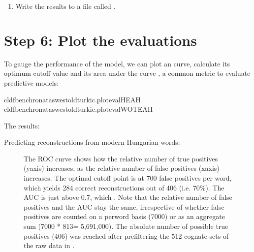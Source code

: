 \documentclass[letterpaper,10pt,english]{sphinxmanual}
\begin{document}
{{{{\begin{fulllineitems}
\begin{enumerate}
\item {} 
\sphinxAtStartPar
Write the results to a file called .

\end{enumerate}

\end{fulllineitems}



\section{Step 6: Plot the evaluations}
\label{\detokenize{mkloanpy:step-6-plot-the-evaluations}}
\sphinxAtStartPar
To gauge the performance of the model, we can plot an  curve,
calculate its optimum cut\sphinxhyphen{}off value and its area under the curve ,
a common metric to evaluate predictive models:

\begin{sphinxVerbatim}[commandchars=\\\{\}]
cldfbenchronataswestoldturkic.plot\PYGZus{}evalHEAH
cldfbenchronataswestoldturkic.plot\PYGZus{}evalWOTEAH
\end{sphinxVerbatim}

\sphinxAtStartPar
The results:

\sphinxAtStartPar
Predicting reconstructions from modern Hungarian words:

\begin{figure}[htbp]
\centering
\capstart

\noindent{}
\caption{The ROC curve shows how the relative number of true positives (y\sphinxhyphen{}axis)
increases, as the relative number of false positives (x\sphinxhyphen{}axis) increases.
The optimal cut\sphinxhyphen{}off point is at 700 false positives per word, which yields
284 correct reconstructions out of 406 (i.e. 70\%). The AUC is just above
0.7, which .
Note that the relative number of false positives and the AUC stay the same,
irrespective of whether false positives are counted on a
per\sphinxhyphen{}word basis (7000) or as an aggregate sum (7000 * 813= 5,691,000).
The absolute number of possible true positives (406) was reached after
prefiltering the 512 cognate sets of the raw data in .}\label{\detokenize{mkloanpy:id2}}\end{figure}

}}}}
\end{document}

